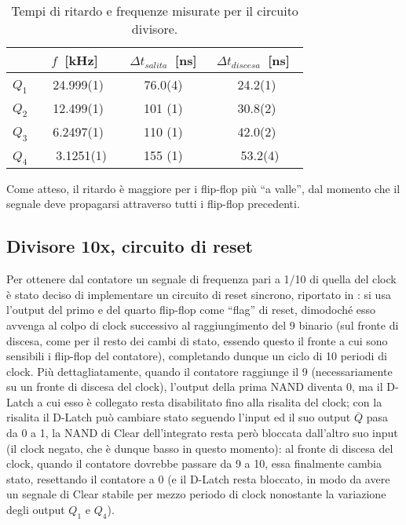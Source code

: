 \begin{table}[h]
	\centering
	\begin{tabular}{l S[table-figures-decimal=4, table-figures-uncertainty=1] S[table-figures-decimal=1, table-figures-integer=3, table-figures-uncertainty=1] S[table-figures-decimal=1, table-figures-uncertainty=1] }
		\toprule
			& {$f$ [\si{\kHz}]} & {$\Delta t_{salita}$ [\si{\ns}]} & {$\Delta t_{discesa}$ [\si{\ns}]} \\
		\midrule
		$Q_1$ & 24.999(1) & 76.0(4) & 24.2(1) \\
		$Q_2$ & 12.499(1) & 101 (1) & 30.8(2) \\
		$Q_3$ & 6.2497(1) & 110 (1) & 42.0(2) \\
		$Q_4$ & 3.1251(1) & 155 (1) & 53.2(4) \\
		\bottomrule
	\end{tabular}
	\caption{Tempi di ritardo e frequenze misurate per il circuito divisore.}
	\label{tab:divlag}
\end{table}

Come atteso, il ritardo è maggiore per i flip-flop più ``a valle'', dal momento che il segnale deve propagarsi attraverso tutti i flip-flop precedenti.

\subsection{Divisore 10x, circuito di reset}
Per ottenere dal contatore un segnale di frequenza pari a 1/10 di quella del clock è stato deciso di implementare un circuito di reset sincrono, riportato in : si usa l'output del primo e del quarto flip-flop come ``flag'' di reset, dimodoché esso avvenga al colpo di clock successivo al raggiungimento del 9 binario (sul fronte di discesa, come per il resto dei cambi di stato, essendo questo il fronte a cui sono sensibili i flip-flop del contatore), completando dunque un ciclo di 10 periodi di clock.
Più dettagliatamente, quando il contatore raggiunge il 9 (necessariamente su un fronte di discesa del clock), l'output della prima NAND diventa 0, ma il D-Latch a cui esso è collegato resta disabilitato fino alla risalita del clock; con la risalita il D-Latch può cambiare stato seguendo l'input ed il suo output $\overline{Q}$ pasa da 0 a 1, la NAND di Clear dell'integrato resta però bloccata dall'altro suo input (il clock negato, che è dunque basso in questo momento): al fronte di discesa del clock, quando il contatore dovrebbe passare da 9 a 10, essa finalmente cambia stato, resettando il contatore a 0 (e il D-Latch resta bloccato, in modo da avere un segnale di Clear stabile per mezzo periodo di clock nonostante la variazione degli output $Q_1$ e $Q_4$).

